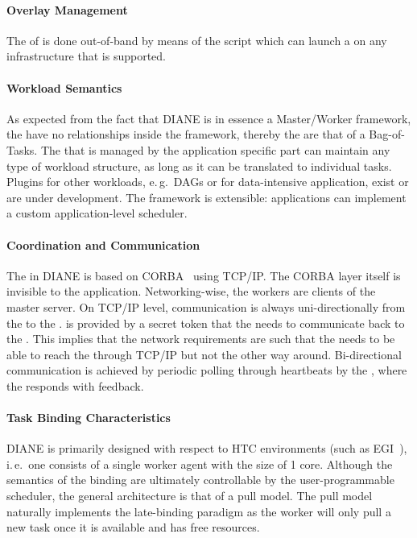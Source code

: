 \documentclass{sig-alternate}
\begin{document}
\paragraph{Overlay Management}
The  of \pilots is done out-of-band by means of the
 script which can launch a \pilot on any infrastructure
that is supported.

\paragraph{Workload Semantics}
As expected from the fact that DIANE is in essence a Master/Worker framework,
the  have no relationships inside the framework, thereby
the  are that of a Bag-of-Tasks.
The  that is managed by the application specific part can
maintain any type of workload structure, as long as it can be translated to
individual tasks\cite{diane-dag, diane-etc}.
Plugins for other workloads, e.\,g.\ DAGs or for data-intensive application,
exist or are under development.
The framework is extensible: applications can implement a custom
application-level scheduler.

\paragraph{Coordination and Communication}
The  in DIANE is based on
CORBA~\cite{OMG-CORBA303:2004} using TCP/IP.
The CORBA layer itself is invisible to the application.
Networking-wise, the workers are clients of the master server.
On TCP/IP level, communication is always uni-directionally from the
 to the .
 is provided by a secret token that the 
needs to communicate back to the .
This implies that the network requirements are such that the
 needs to be able to reach the  through
TCP/IP but not the other way around.
Bi-directional communication is achieved by periodic polling through
heartbeats by the , where the  responds
with feedback.

\paragraph{Task Binding Characteristics}
DIANE is primarily designed with respect to HTC environments (such as
EGI~\cite{egi}), i.\,e.\ one \pilot consists of a single worker agent with the
size of 1 core.
Although the semantics of the binding are ultimately controllable by the
user-programmable scheduler, the general architecture is that of a pull model.
The pull model naturally implements the late-binding paradigm as the worker
will only pull a new task once it is available and has free resources.
\end{document}
